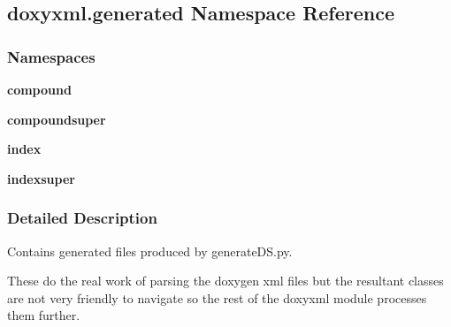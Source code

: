 \subsection{doxyxml.\+generated Namespace Reference}
\label{namespacedoxyxml_1_1generated}
\subsubsection*{Namespaces}
\begin{DoxyCompactItemize}
\item 
 {\bf compound}
\item 
 {\bf compoundsuper}
\item 
 {\bf index}
\item 
 {\bf indexsuper}
\end{DoxyCompactItemize}


\subsubsection{Detailed Description}
\begin{DoxyVerb}Contains generated files produced by generateDS.py.

These do the real work of parsing the doxygen xml files but the
resultant classes are not very friendly to navigate so the rest of the
doxyxml module processes them further.
\end{DoxyVerb}
 